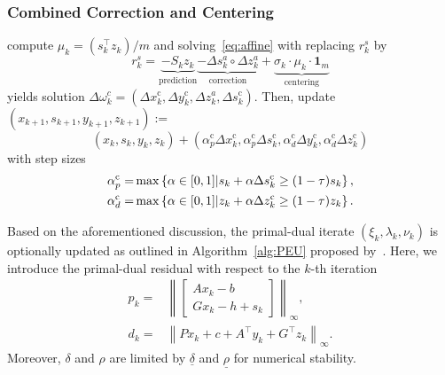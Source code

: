 \documentclass[letterpaper, 10 pt, conference]{ieeeconf}  \IEEEoverridecommandlockouts
\begin{document}
\subsubsection{Combined Correction and Centering} compute $\mu_k = \left(s_k^\top z_k\right) / m$ and solving~\eqref{eq:affine} with replacing $r_k^s$ by  
\begin{equation}
\label{eq:rsk}
r_k^s = \underbrace{- S_k z_k}_{\text{prediction}} \underbrace{- \Delta s^a_k \circ \Delta z^a_k}_{\text{correction}} + \underbrace{\sigma_k\cdot \mu_k\cdot \mathbf{1}_m}_{\text{centering}}
\end{equation}
yields solution $\Delta \omega_k^c = (\Delta x_k^\text{c}, \Delta y_k^\text{c},\Delta z_k^a, \Delta s_k^\text{c})$. Then, update $(x_{k+1},s_{k+1},y_{k+1},z_{k+1}):=$
\[
(x_{k},s_{k},y_{k},z_{k}) +  (\alpha^\text{c}_p\Delta x_{k}^\text{c},\alpha^\text{c}_p\Delta s_{k}^\text{c},\alpha^\text{c}_d\Delta y_{k}^\text{c},\alpha^\text{c}_d\Delta z_{k}^\text{c})
\]
with step sizes
\begin{align}\notag
\alpha^\text{c}_p =&\max\left\{\alpha\in[0,1]| s_k+\alpha \Delta s_k^\text{c}\geq (1-\tau)s_k\right\},\\\label{eq:centering_step_size}
\alpha^\text{c}_d =&\max\left\{\alpha\in[0,1]| z_k+\alpha \Delta z_k^\text{c}\geq (1-\tau)z_k\right\}.
\end{align}

Based on the aforementioned discussion, the primal-dual iterate $(\xi_k,\lambda_k,\nu_k)$ is optionally updated as outlined in Algorithm~\ref{alg:PEU} proposed by~\cite[Section 5.1.4]{pougkakiotis2021}. Here, we introduce the primal-dual residual with respect to the $k$-th iteration
\[
\begin{aligned}
p_k =& \left\|\begin{bmatrix} Ax_k - b \\ Gx_k - h + s_k \end{bmatrix}\right\|_\infty,\\
d_k =& \left\|Px_k + c +A^\top y_k + G^\top z_k\right\|_\infty.
\end{aligned}
\]
Moreover, $\delta$ and $\rho$ are limited by $\underline{\delta}$ and $\underline{\rho}$ for numerical stability.
\end{document}
